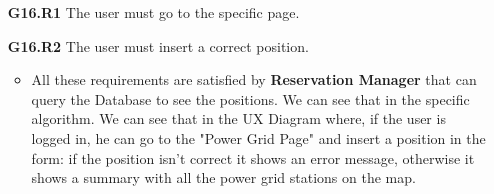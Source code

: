 \begin{itemize}
\item[\textbf{G16.R1}] The user must go to the specific page.
\item[\textbf{G16.R2}] The user must insert a correct position.
\begin{itemize}
\item All these requirements are satisfied by \textbf{Reservation Manager} that can query the Database to see the positions. We can see that in the specific algorithm. We can see that in the UX Diagram where, if the user is logged in, he can go to the "Power Grid Page" and insert a position in the form: if the position isn't correct it shows an error message, otherwise it shows a summary with all the power grid stations on the map. 
\end{itemize}
\end{itemize}

